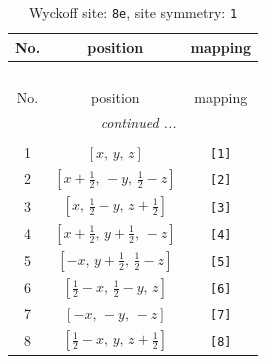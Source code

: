 \documentclass[fleqn,8pt]{jsarticle}
\begin{document}
\renewcommand{\arraystretch}{1.2}
\begin{longtable}{ccc}
\caption{Wyckoff site: {\tt 8e}, site symmetry: {\tt 1}}
 \\
 \hline \hline
No. & position & mapping \\ \hline \endfirsthead

\multicolumn{2}{l}{\tablename\ \thetable{}} \\
 \hline \hline
No. & position & mapping \\ \hline \endhead

 \hline \hline
\multicolumn{2}{r}{\footnotesize\it continued ...} \\ \endfoot

 \hline \hline
\multicolumn{2}{r}{} \\ \endlastfoot

1 & $\left[ x,\, y,\, z \right]$ & {\tt [1]} \\ \hline
2 & $\left[ x + \frac{1}{2},\, - y,\, \frac{1}{2} - z \right]$ & {\tt [2]} \\ \hline
3 & $\left[ x,\, \frac{1}{2} - y,\, z + \frac{1}{2} \right]$ & {\tt [3]} \\ \hline
4 & $\left[ x + \frac{1}{2},\, y + \frac{1}{2},\, - z \right]$ & {\tt [4]} \\ \hline
5 & $\left[ - x,\, y + \frac{1}{2},\, \frac{1}{2} - z \right]$ & {\tt [5]} \\ \hline
6 & $\left[ \frac{1}{2} - x,\, \frac{1}{2} - y,\, z \right]$ & {\tt [6]} \\ \hline
7 & $\left[ - x,\, - y,\, - z \right]$ & {\tt [7]} \\ \hline
8 & $\left[ \frac{1}{2} - x,\, y,\, z + \frac{1}{2} \right]$ & {\tt [8]} \\
\end{longtable}
\end{document}
